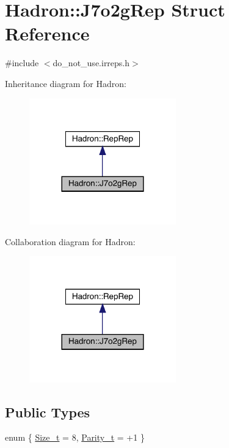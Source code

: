 \hypertarget{structHadron_1_1J7o2gRep}{}\section{Hadron\+:\+:J7o2g\+Rep Struct Reference}
\label{structHadron_1_1J7o2gRep}


{\ttfamily \#include $<$do\+\_\+not\+\_\+use.\+irreps.\+h$>$}



Inheritance diagram for Hadron\+:\nopagebreak
\begin{figure}[H]
\begin{center}
\leavevmode
\includegraphics[width=180pt]{d0/d39/structHadron_1_1J7o2gRep__inherit__graph}
\end{center}
\end{figure}


Collaboration diagram for Hadron\+:\nopagebreak
\begin{figure}[H]
\begin{center}
\leavevmode
\includegraphics[width=180pt]{d1/daa/structHadron_1_1J7o2gRep__coll__graph}
\end{center}
\end{figure}
\subsection*{Public Types}
\begin{DoxyCompactItemize}
\item 
enum \{ \mbox{\hyperlink{structHadron_1_1J7o2gRep_ae9935e9fbc11ad93c78aa1d6859e1b32aad928638b0bc37f19deca797581244d3}{Size\+\_\+t}} = 8, 
\mbox{\hyperlink{structHadron_1_1J7o2gRep_ae9935e9fbc11ad93c78aa1d6859e1b32ad6a5bc41dc51763055075fe83998122d}{Parity\+\_\+t}} = +1
 \}
\end{DoxyCompactItemize}
